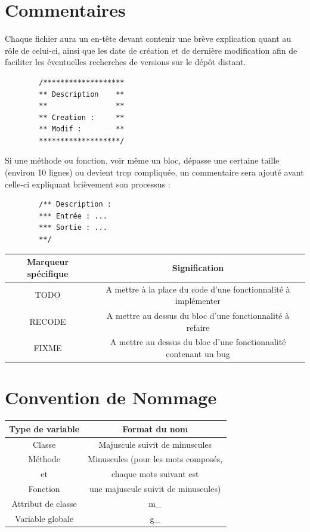 \documentclass[a4paper]{article}
\newcommand{\alinea}{\hspace*{0.5cm}}
\begin{document}
    \section{Commentaires}
      \alinea Chaque fichier aura un en-tête devant contenir une brève explication quant au rôle de celui-ci, ainsi que les date de création et de dernière modification afin de faciliter les éventuelles recherches de versions sur le dépôt distant.\\
      \begin{verbatim}
        /*******************
        ** Description    **
        **                **
        ** Creation :     **
        ** Modif :        **
        *******************/
      \end{verbatim}
      \alinea Si une méthode ou fonction, voir même un bloc, dépasse une certaine taille (environ 10 lignes) ou devient trop compliquée, un commentaire sera ajouté avant celle-ci expliquant brièvement son processus :
      \begin{verbatim}
        /** Description :
        *** Entrée : ...
        *** Sortie : ...
        **/
      \end{verbatim}
      \begin{small}
        \begin{tabular}{| c | c |}
          \hline
          \textbf{Marqueur spécifique} & \textbf{Signification}\\
          \hline
          TODO & A mettre à la place du code d'une fonctionnalité à implémenter\\
          \hline
          RECODE & A mettre au dessus du bloc d'une fonctionnalité à refaire\\
          \hline
          FIXME & A mettre au dessus du bloc d'une fonctionnalité contenant un bug\\
          \hline
        \end{tabular}
      \end{small}

    \section{Convention de Nommage}
      \begin{small}
        \begin{tabular}{| c | c |}
          \hline
          \textbf{Type de variable} & \textbf{Format du nom}\\
          \hline
          Classe & Majuscule suivit de minuscules\\
          \hline
          Méthode& Minuscules (pour les mots composés,\\
          et & chaque mots suivant est\\
          Fonction & une majuscule suivit de minuscules)\\
          \hline
          Attribut de classe & m\_\\
          \hline
          Variable globale & g\_\\
          \hline
        \end{tabular}
      \end{small}
\end{document}
